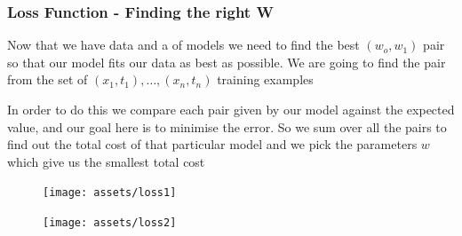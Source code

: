 
		\subsubsection{Loss Function - Finding the right W}

			\par{Now that we have data and a  of models we need to find the best $(w_o, w_1)$ pair so that our model fits our data as best as possible. We are going to find the pair from the set of $(x_1,t_1), \dots, (x_n,t_n)$ training examples}

			\par{In order to do this we compare each pair given by our model against the expected value, and our goal here is to minimise the error. So we sum over all the pairs to find out the total cost of that particular model and we pick the parameters $w$ which give us the smallest total cost}




			\begin{minipage}{\linewidth}
			\centering
			\begin{minipage}{0.45\linewidth}
			\begin{figure}[ht]
			\texttt{[image: assets/loss1]}
			\end{figure}
			\end{minipage}
			\hspace{0.05\linewidth}
			\begin{minipage}{0.45\linewidth}
			\begin{figure}[ht]
			\texttt{[image: assets/loss2]}
			\end{figure}
			\end{minipage}
			\end{minipage}


